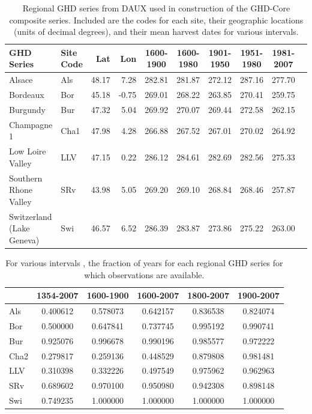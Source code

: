 \documentclass[12pt]{article}
\begin{document}
\begin{table}
\small
\caption{\small Regional GHD series from DAUX used in construction of the GHD-Core composite series. Included are the codes for each site, their geographic locations (units of decimal degrees), and their mean harvest dates for various intervals.}
\centering
\begin{tabular}{| l l | r r | c c c c c p{5cm} |}
\hline
 \bf GHD Series & \bf Site Code & \bf Lat & \bf Lon & \bf 1600-1900 & \bf 1600-1980 & \bf 1901-1950 & \bf 1951-1980 & \bf 1981-2007 \\
\hline
Alsace	& Als & 48.17 & 7.28 & 282.81 & 281.87 & 272.12 & 287.16	 & 277.70 \\
Bordeaux	& Bor	& 45.18 & -0.75	& 269.01 & 	268.22	&  263.85 &  270.41 &  259.75\\
Burgundy	& Bur	& 47.32	& 5.04	& 269.92	& 270.07	& 269.44	& 272.58	& 262.15\\
Champagne 1	& Cha1	& 47.98	& 4.28	& 266.88	& 267.52	& 267.01	& 270.02	& 264.92\\
Low Loire Valley	& LLV	& 47.15	& 0.22	& 286.12	& 284.61	& 282.69	& 282.56	& 275.33\\
Southern Rhone Valley	& SRv	& 43.98	& 5.05	& 269.20	& 269.10	& 268.84	& 268.46	& 257.87\\
Switzerland (Lake Geneva)	& Swi	& 46.57	& 6.52	& 286.39	& 283.87	& 273.86	& 275.22	& 263.00\\
\hline
\end{tabular}
\end{table}

\begin{table}
\small
\caption{\small For various intervals , the fraction of years for each regional GHD series for which observations are available.}
\centering
\begin{tabular}{l c c c c c}
\hline
 & \bf 1354-2007 & \bf 1600-1900 & \bf 1600-2007 & \bf 1800-2007 & \bf 1900-2007\\
\hline
Als	& 0.400612 & 0.578073 & 0.642157 & 0.836538	 & 0.824074\\
Bor	 & 0.500000 & 0.647841 & 0.737745 & 0.995192 & 0.990741\\
Bur & 	0.925076	& 0.996678	& 0.990196	& 0.985577	& 0.972222\\
Cha2	& 0.279817	& 0.259136	& 0.448529	& 0.879808	& 0.981481\\
LLV	& 0.310398	& 0.332226	& 0.497549	& 0.975962	& 0.962963\\
SRv	& 0.689602	& 0.970100	& 0.950980	& 0.942308	& 0.898148\\
Swi 	& 0.749235	& 1.000000	& 1.000000	& 1.000000	& 1.000000\\
\hline
\end{tabular}
\end{table}
\end{document}
